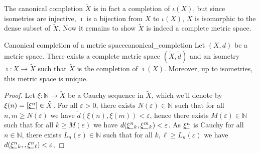 The canonical completion \(\tilde{X}\) is in fact a completion of \(\iota(X)\), but since isometries are injective, \(\imath\) is a bijection from \(X\) to \(\iota(X)\), \(X\) is isomorphic to the dense subset of \(\tilde{X}\). Now it remains to show \(\tilde{X}\) is indeed a complete metric space.
\begin{theorem}{Canonical completion of a metric space}{canonical_completion}
    Let \((X, d)\) be a metric space. There exists a complete metric space \((\tilde{X}, \tilde{d})\) and an isometry \(\imath : X \to \tilde{X}\) such that \(\tilde{X}\) is the completion of \(\imath(X)\). Moreover, up to isometries, this metric space is unique.
\end{theorem}
\begin{proof}
    Let \(\xi : \mathbb{N} \to \tilde{X}\) be a Cauchy sequence in \(\tilde{X}\), which we'll denote by \(\xi(n) = [\sequnder{\xi^n}] \in \tilde{X}\). For all \(\varepsilon > 0\), there exists \(N(\varepsilon) \in \mathbb{N}\) such that for all \(n,m \geq N(\varepsilon)\) we have \(\tilde{d}\left(\xi(n), \xi(m)\right) < \varepsilon\), hence there exists \(M(\varepsilon) \in \mathbb{N}\) such that for all \(k \geq M(\varepsilon)\) we have \(d(\sequnder{\xi^n}_k, \sequnder{\xi^m}_k) < \varepsilon\). As \(\sequnder{\xi^n}\) is Cauchy for all \(n \in \mathbb{N}\), there exists \(L_n(\varepsilon) \in \mathbb{N}\) such that for all \(k, \ell \geq L_n(\varepsilon)\) we have \(d(\sequnder{\xi^n}_k, ,\sequnder{\xi^n}_\ell) < \varepsilon\).


\end{proof}
